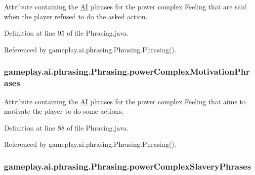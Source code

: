 Attribute containing the \hyperlink{classgameplay_1_1ai_1_1_a_i}{A\-I} phrases for the power complex Feeling that are said when the player refused to do the asked action. 



Definition at line 95 of file Phrasing.\-java.



Referenced by gameplay.\-ai.\-phrasing.\-Phrasing.\-Phrasing().

\hypertarget{classgameplay_1_1ai_1_1phrasing_1_1_phrasing_ad566ad78166872e95e920833f4f36e90}{
\subsubsection[{power\-Complex\-Motivation\-Phrases}]{ gameplay.\-ai.\-phrasing.\-Phrasing.\-power\-Complex\-Motivation\-Phrases\hspace{0.3cm}{\ttfamily [protected]}}}\label{classgameplay_1_1ai_1_1phrasing_1_1_phrasing_ad566ad78166872e95e920833f4f36e90}


Attribute containing the \hyperlink{classgameplay_1_1ai_1_1_a_i}{A\-I} phrases for the power complex Feeling that aims to motivate the player to do some actions. 



Definition at line 88 of file Phrasing.\-java.



Referenced by gameplay.\-ai.\-phrasing.\-Phrasing.\-Phrasing().

\hypertarget{classgameplay_1_1ai_1_1phrasing_1_1_phrasing_afc6cf63da008d88b88e0e8138bb2fda9}{
\subsubsection[{power\-Complex\-Slavery\-Phrases}]{ gameplay.\-ai.\-phrasing.\-Phrasing.\-power\-Complex\-Slavery\-Phrases\hspace{0.3cm}{\ttfamily [protected]}}}\label{classgameplay_1_1ai_1_1phrasing_1_1_phrasing_afc6cf63da008d88b88e0e8138bb2fda9}


